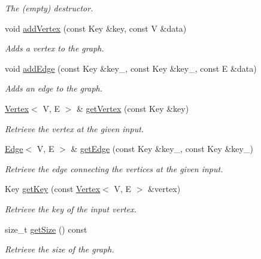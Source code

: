 \begin{DoxyCompactItemize}
\begin{DoxyCompactList}\small\item\em The (empty) destructor. \end{DoxyCompactList}\item 
void \hyperlink{class_graph_a702f2b76029522c7e18bd3fd41a4bf6e}{add\+Vertex} (const Key \&key, const V \&data)
\begin{DoxyCompactList}\small\item\em Adds a vertex to the graph. \end{DoxyCompactList}\item 
void \hyperlink{class_graph_a051851f77b26c8a28bb5e07dd58c14da}{add\+Edge} (const Key \&key\+\_, const Key \&key\+\_, const E \&data)
\begin{DoxyCompactList}\small\item\em Adds an edge to the graph. \end{DoxyCompactList}\item 
\hyperlink{struct_vertex}{Vertex}$<$ V, E $>$ \& \hyperlink{class_graph_aac27624b986945639260a6e9562b7ff8}{get\+Vertex} (const Key \&key)
\begin{DoxyCompactList}\small\item\em Retrieve the vertex at the given input. \end{DoxyCompactList}\item 
\hyperlink{struct_edge}{Edge}$<$ V, E $>$ \& \hyperlink{class_graph_a86f2bb9185e6c7fd7db037e3bc1e0be5}{get\+Edge} (const Key \&key\+\_, const Key \&key\+\_)
\begin{DoxyCompactList}\small\item\em Retrieve the edge connecting the vertices at the given input. \end{DoxyCompactList}\item 
Key \hyperlink{class_graph_af3629a385f2e88d86f769aa9b9984795}{get\+Key} (const \hyperlink{struct_vertex}{Vertex}$<$ V, E $>$ \&vertex)
\begin{DoxyCompactList}\small\item\em Retrieve the key of the input vertex. \end{DoxyCompactList}\item 
size\+\_\+t \hyperlink{class_graph_a99e8a0471b0aebb5a01905013d0b48b1}{get\+Size} () const 
\begin{DoxyCompactList}\small\item\em Retrieve the size of the graph. \end{DoxyCompactList}\item 

\end{DoxyCompactItemize}
